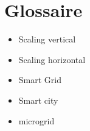 \chapter*{Glossaire}

\begin{itemize}
    \item Scaling vertical
    \item Scaling horizontal
    \item Smart Grid
    \item Smart city
    \item microgrid
\end{itemize}